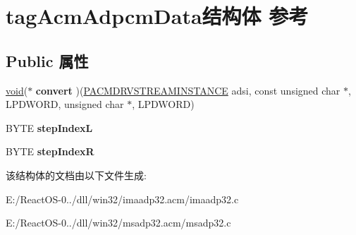\hypertarget{structtag_acm_adpcm_data}{}\section{tag\+Acm\+Adpcm\+Data结构体 参考}
\label{structtag_acm_adpcm_data}
\subsection*{Public 属性}
\begin{DoxyCompactItemize}
\item 
\mbox{\label{structtag_acm_adpcm_data_a60fa27cb39aef1455f3a218b5fea8874}} 
\hyperlink{interfacevoid}{void}($\ast$ {\bfseries convert} )(\hyperlink{struct___a_c_m_d_r_v_s_t_r_e_a_m_i_n_s_t_a_n_c_e}{P\+A\+C\+M\+D\+R\+V\+S\+T\+R\+E\+A\+M\+I\+N\+S\+T\+A\+N\+CE} adsi, const unsigned char $\ast$, L\+P\+D\+W\+O\+RD, unsigned char $\ast$, L\+P\+D\+W\+O\+RD)
\item 
\mbox{\label{structtag_acm_adpcm_data_aa8312791e91ffef7b80ca4d9c4d5fc40}} 
B\+Y\+TE {\bfseries step\+IndexL}
\item 
\mbox{\label{structtag_acm_adpcm_data_a2ca06183e5770da311e80e2901dc9c11}} 
B\+Y\+TE {\bfseries step\+IndexR}
\end{DoxyCompactItemize}


该结构体的文档由以下文件生成\+:\begin{DoxyCompactItemize}
\item 
E\+:/\+React\+O\+S-\/0../dll/win32/imaadp32.\+acm/imaadp32.\+c\item 
E\+:/\+React\+O\+S-\/0../dll/win32/msadp32.\+acm/msadp32.\+c\end{DoxyCompactItemize}
